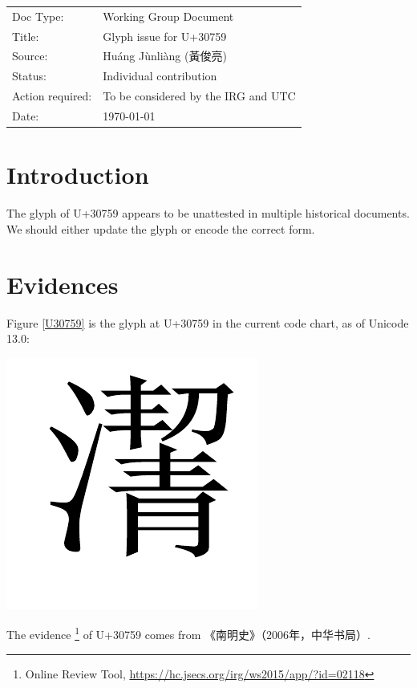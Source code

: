 \documentclass{article}
\begin{document}
\begin{tabular}{l l}
Doc Type: & Working Group Document \\

Title: & Glyph issue for U+30759 \\

Source: & Huáng Jùnliàng (黃俊亮)  \\

Status: & Individual contribution \\

Action required: & To be considered by the IRG and UTC \\

Date: & \today \\
\end{tabular}

\section{Introduction}
The glyph of U+30759 appears to be unattested in multiple historical documents. We should either update the glyph or encode the correct form.

\section{Evidences}
Figure \ref{U30759} is the glyph at U+30759 in the current code chart, as of Unicode 13.0:
\begin{center}
    \includegraphics{30759_U.pdf}
    \label{U30759}
\end{center}

The evidence \footnote{Online Review Tool, \url{https://hc.jsecs.org/irg/ws2015/app/?id=02118}} of U+30759 comes from 《南明史》（2006年，中华书局）\cite[p. 1003]{南明史}.
\end{document}

